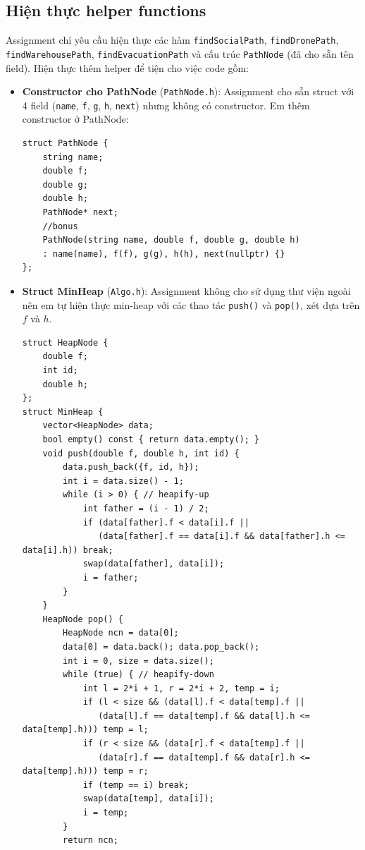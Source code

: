 \documentclass[13pt,a4paper]{article}
\begin{document}
\subsection*{Hiện thực helper functions}
Assignment chỉ yêu cầu hiện thực các hàm \texttt{findSocialPath}, \texttt{findDronePath}, \texttt{findWarehousePath}, \texttt{findEvacuationPath} và cấu trúc \texttt{PathNode} (đã cho sẵn tên field). Hiện thực thêm helper để tiện cho việc code gồm:
\begin{itemize}
    \item \textbf{Constructor cho PathNode} (\texttt{PathNode.h}): Assignment cho sẵn struct với 4 field (\texttt{name}, \texttt{f}, \texttt{g}, \texttt{h}, \texttt{next}) nhưng không có constructor. Em thêm constructor ở PathNode:
\begin{lstlisting}
struct PathNode {
    string name;
    double f;
    double g;
    double h;
    PathNode* next;
    //bonus
    PathNode(string name, double f, double g, double h)
    : name(name), f(f), g(g), h(h), next(nullptr) {}
};
\end{lstlisting}
    \item \textbf{Struct MinHeap} (\texttt{Algo.h}): Assignment không cho sử dụng thư viện ngoài nên em tự hiện thực min-heap với các thao tác \texttt{push()} và \texttt{pop()}, xét dựa trên $f$ và $h$.
\begin{lstlisting}
struct HeapNode {
    double f; 
    int id; 
    double h;
};
struct MinHeap {
    vector<HeapNode> data;
    bool empty() const { return data.empty(); }
    void push(double f, double h, int id) {
        data.push_back({f, id, h});
        int i = data.size() - 1;
        while (i > 0) { // heapify-up
            int father = (i - 1) / 2;
            if (data[father].f < data[i].f || 
               (data[father].f == data[i].f && data[father].h <= data[i].h)) break;
            swap(data[father], data[i]);
            i = father;
        }
    }
    HeapNode pop() {
        HeapNode ncn = data[0];
        data[0] = data.back(); data.pop_back();
        int i = 0, size = data.size();
        while (true) { // heapify-down
            int l = 2*i + 1, r = 2*i + 2, temp = i;
            if (l < size && (data[l].f < data[temp].f || 
               (data[l].f == data[temp].f && data[l].h <= data[temp].h))) temp = l;
            if (r < size && (data[r].f < data[temp].f || 
               (data[r].f == data[temp].f && data[r].h <= data[temp].h))) temp = r;
            if (temp == i) break;
            swap(data[temp], data[i]);
            i = temp;
        }
        return ncn;

\end{lstlisting}
\end{itemize}
\end{document}
